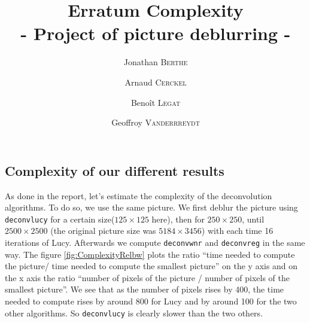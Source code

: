 \documentclass{article}
\title{ \textbf{Erratum Complexity} \\ - Project of picture deblurring - }
\author{Jonathan \textsc{Berthe} \and Arnaud \textsc{Cerckel} \and Benoît \textsc{Legat} \and Geoffroy \textsc{Vanderrreydt}}
\begin{document}
\maketitle

\subsection{Complexity of our different results}


As done in the report, let's estimate the complexity of the deconvolution algorithms. To do so, we use the same picture. We first deblur the picture using \texttt{deconvlucy} for a certain size($125 \times 125$ here), then for $250 \times 250$, until $2500 \times 2500$ (the original picture  size was $5184 \times 3456$) with each time 16 iterations of Lucy. Afterwards we compute  \texttt{deconvwnr} and \texttt{deconvreg} in the same way. The figure \ref{fig:ComplexityRelbw} plots the ratio ``time needed to compute the picture/ time needed to compute the smallest picture'' on the y axis and on the x axis the ratio ``number of pixels of the picture / number of pixels of the smallest picture''. We see that as the number of pixels rises by 400, the time needed to compute rises by around 800 for Lucy and by around 100 for the two other algorithms. So \texttt{deconvlucy} is clearly slower than the two others. 
\end{document}

